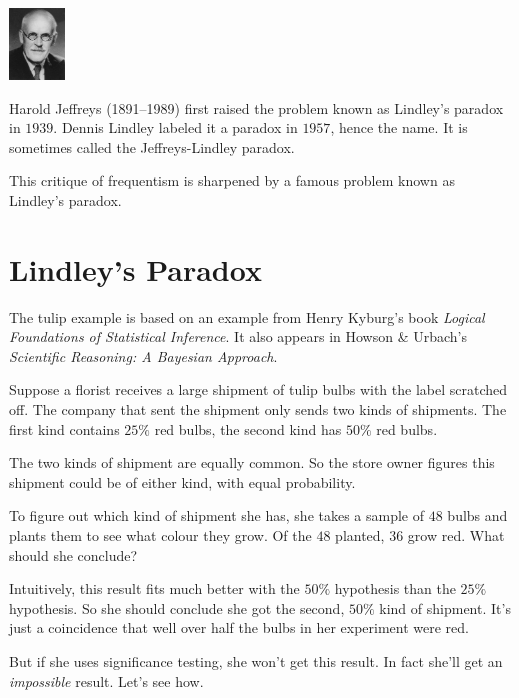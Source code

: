 \documentclass[justified]{tufte-book}
\theoremstyle{definition}
\theoremstyle{definition}
\theoremstyle{definition}
\theoremstyle{definition}
\theoremstyle{remark}
\begin{document}
\begin{marginfigure}
\includegraphics[width=0.58in]{img/jeffreys} \caption[Harold Jeffreys (1891--1989) first raised the problem known as Lindley's paradox in $1939$]{Harold Jeffreys (1891--1989) first raised the problem known as Lindley's paradox in $1939$. Dennis Lindley labeled it a paradox in $1957$, hence the name. It is sometimes called the Jeffreys-Lindley paradox.}\label{fig:unnamed-chunk-153}
\end{marginfigure}

This critique of frequentism is sharpened by a famous problem known as Lindley's paradox.

\hypertarget{lindleys-paradox}{%
\section{Lindley's Paradox}\label{lindleys-paradox}}

\begin{marginfigure}
The tulip example is based on an example from Henry Kyburg's book
\emph{Logical Foundations of Statistical Inference}. It also appears in
Howson \& Urbach's \emph{Scientific Reasoning: A Bayesian Approach}.
\end{marginfigure}

Suppose a florist receives a large shipment of tulip bulbs with the label scratched off. The company that sent the shipment only sends two kinds of shipments. The first kind contains \(25\%\) red bulbs, the second kind has \(50\%\) red bulbs.

The two kinds of shipment are equally common. So the store owner figures this shipment could be of either kind, with equal probability.

To figure out which kind of shipment she has, she takes a sample of \(48\) bulbs and plants them to see what colour they grow. Of the \(48\) planted, \(36\) grow red. What should she conclude?

Intuitively, this result fits much better with the \(50\%\) hypothesis than the \(25\%\) hypothesis. So she should conclude she got the second, \(50\%\) kind of shipment. It's just a coincidence that well over half the bulbs in her experiment were red.

But if she uses significance testing, she won't get this result. In fact she'll get an \emph{impossible} result. Let's see how.
\end{document}
